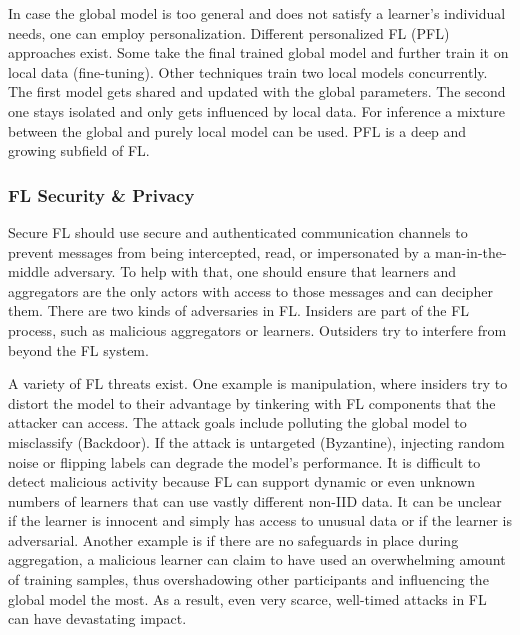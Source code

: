 In case the global model is too general and does not satisfy a
learner's individual needs, one can employ personalization.
Different personalized FL (PFL) approaches exist.
Some take the final trained global model and further train it on local data (fine-tuning).
Other techniques train two local models concurrently.
The first model gets shared and updated with the global parameters.
The second one stays isolated and only gets influenced by local data.
For inference a mixture between the global and purely local model can be used.
PFL is a deep and growing subfield of FL.


\subsubsection{FL Security \& Privacy}
Secure FL should use secure and authenticated communication channels
to prevent messages from being intercepted, read,
or impersonated by a man-in-the-middle adversary.
To help with that, one should ensure that 
learners and aggregators are the only actors with
access to those messages and can decipher them.
There are two kinds of adversaries in FL.
Insiders are part of the FL process, such as
malicious aggregators or learners.
Outsiders try to interfere from beyond the FL system.

A variety of FL threats exist.
One example is manipulation, where insiders try to distort
the model to their advantage by tinkering with FL components
that the attacker can access.
The attack goals include polluting the global model
to misclassify (Backdoor).
If the attack is untargeted (Byzantine), injecting random noise or
flipping labels can degrade the model's performance.
It is difficult to detect malicious activity because
FL can support dynamic or even unknown numbers of learners
that can use vastly different non-IID data.
It can be unclear if the learner is innocent and simply has
access to unusual data or if the learner is adversarial.
Another example is if there are no safeguards in place during aggregation,
a malicious learner can claim to have used an overwhelming amount of training samples,
thus overshadowing other participants and influencing the global model the most.
As a result, even very scarce, well-timed attacks in FL can have devastating impact.

